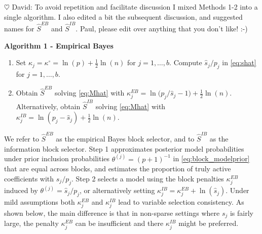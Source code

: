 \documentclass[aos]{imsart}
\theoremstyle{plain}
\newcommand{\david}[1]{{\small{\color{blue} \sf $\heartsuit$ David: #1}}}
\newcommand{\bs}{\boldsymbol}
\begin{document}
\david{To avoid repetition and facilitate discussion I mixed Methods 1-2 into a single algorithm. I also edited a bit the subsequent discussion, and suggested names for $\hat{S}^{EB}$ and $\hat{S}^{IB}$. Paul, please edit over anything that you don't like! :-)}

\textbf{Algorithm 1 - Empirical Bayes}
\begin{enumerate}
    \item Set %
    $\kappa_j=\kappa^{\circ}=\ln(p)+\frac{1}{2}\ln(n)$ for $j=1,\ldots,b$. Compute $\widehat{s}_j/p_j$ in \eqref{eq:shat} for $j=1,\ldots,b$.

    \item Obtain $\hat{S}^{EB}$ solving \eqref{eq:Mhat} with $\kappa_j^{EB}= \ln\bigg(p_j/\widehat{s}_j -1\bigg)+ \tfrac{1}{2}\ln(n)$.
    Alternatively, obtain $\hat{S}^{IB}$ solving \eqref{eq:Mhat} with
    $\kappa_j^{IB} = \ln(p_j-\widehat{s}_j)+ \tfrac{1}{2}\ln(n)$.
\end{enumerate}

We refer to $\hat{S}^{EB}$ as the empirical Bayes block selector, and to $\hat{S}^{IB}$ as the information block selector.
Step 1 approximates posterior model probabilities under prior inclusion probabilities $\theta^{(j)}=(p+1)^{-1}$ in \eqref{eq:block_modelprior} that are equal across blocks, and estimates the proportion of truly active coefficients with $\hat{s}_j/p_j$. Step 2 selects a model using the block penalties $\kappa_j^{EB}$ induced by $\theta^{(j)}=\hat{s}_j/p_j$, %
or alternatively setting $\kappa_j^{IB}= \kappa_j^{EB} + \ln(\hat{s}_j)$.
Under mild assumptions both $\kappa_j^{EB}$ and $\kappa_j^{IB}$ lead to variable selection consistency.
As shown below, the main difference is that in non-sparse settings where $s_j$ is fairly large, the penalty $\kappa_j^{EB}$ can be insufficient and there $\kappa_j^{IB}$ might be preferred. %
\end{document}
